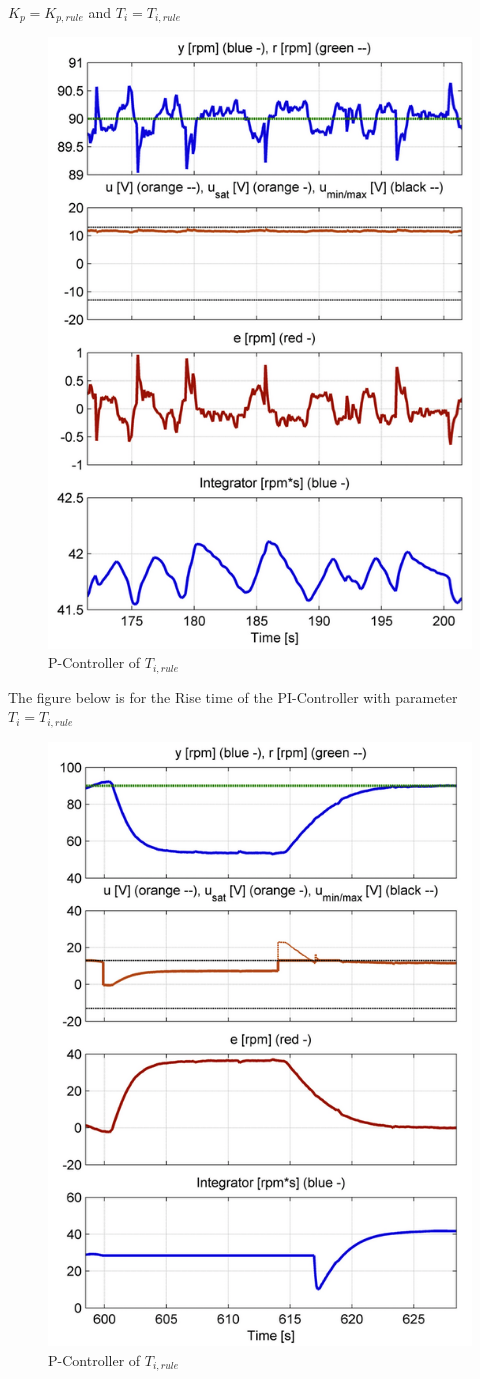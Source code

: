 \begin{center}
{$K_{p}= K_{p,rule}$ and $T_{i}=T_{i,rule}$}
\end{center}
\begin{figure}[H]
\begin{center}
\includegraphics[width=0.6\linewidth]{images/general//PI/PI_Controller1}
\end{center}
\caption{P-Controller of $ T_{i,rule}$}
\label{fig:PI_Controller02}
\end{figure}
The figure below is for the Rise time of the PI-Controller with parameter $T_{i}= {T_{i,rule}}$
\begin{figure}[H]
\begin{center}
\includegraphics[width=0.6\linewidth]{images/general//PI/PI_RiseTime1}
\end{center}
\caption{P-Controller of $ T_{i,rule}$}
\label{fig:PI_RiseTime1}
\end{figure}

